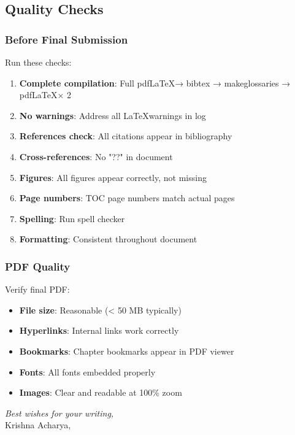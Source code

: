 \subsection*{Quality Checks}

\subsubsection*{Before Final Submission}

Run these checks:

\begin{enumerate}
    \item \textbf{Complete compilation}: Full pdf\LaTeX → bibtex → makeglossaries → pdf\LaTeX × 2
    \item \textbf{No warnings}: Address all \LaTeX warnings in log
    \item \textbf{References check}: All citations appear in bibliography
    \item \textbf{Cross-references}: No "??" in document
    \item \textbf{Figures}: All figures appear correctly, not missing
    \item \textbf{Page numbers}: TOC page numbers match actual pages
    \item \textbf{Spelling}: Run spell checker
    \item \textbf{Formatting}: Consistent throughout document
\end{enumerate}

\subsubsection*{PDF Quality}

Verify final PDF:

\begin{itemize}
    \item \textbf{File size}: Reasonable (< 50 MB typically)
    \item \textbf{Hyperlinks}: Internal links work correctly
    \item \textbf{Bookmarks}: Chapter bookmarks appear in PDF viewer
    \item \textbf{Fonts}: All fonts embedded properly
    \item \textbf{Images}: Clear and readable at 100\% zoom
\end{itemize}



\vspace{1em}
\noindent\textit{Best wishes for your writing,} \\
Krishna Acharya,\\